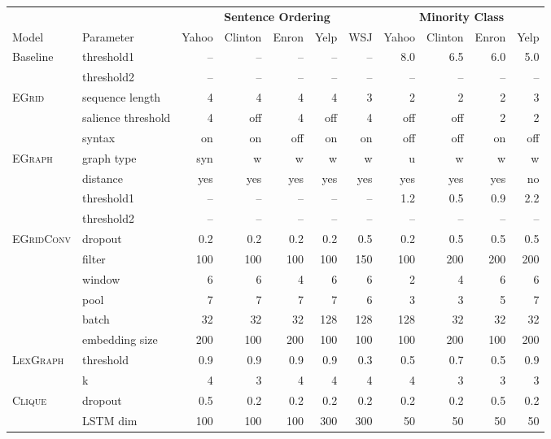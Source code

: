 \documentclass[11pt,a4paper]{article}
\newcommand \egrid{\textsc{EGrid}\xspace}
\newcommand \egraph{\textsc{EGraph}\xspace}
\newcommand \lexgraph{\textsc{LexGraph}\xspace}
\newcommand \clique{\textsc{Clique}\xspace}
\newcommand \egridconv{\textsc{EGridConv}\xspace}
\begin{document}
\begin{table*}[htb]
\begin{center}
\begin{footnotesize}
\begin{tabular}{llrrrrrrrrr}
\toprule
 & & \multicolumn{5}{c}{\textbf{Sentence Ordering}} & \multicolumn{4}{c}{\textbf{Minority Class}} \\
Model & Parameter & Yahoo & Clinton & Enron & Yelp & WSJ & Yahoo & Clinton & Enron & Yelp \\
\midrule
Baseline & threshold1  & -- & -- & -- & -- & -- & 8.0 & 6.5 & 6.0 & 5.0 \\
			& threshold2 & -- & -- & -- & -- & -- & -- & -- & -- & -- \\
\midrule
\egrid	& sequence length &  4 & 4 & 4 & 4 & 3 & 2 & 2 & 2 & 3 \\
		& salience threshold & 4 & off & 4 & off & 4 & off & off & 2 & 2 \\
        & syntax & on & on & off & on & on & off & off & on & off \\
        \midrule
\egraph 	& graph type &  syn & w & w & w & w & u & w & w & w \\
		& distance & yes & yes & yes & yes & yes & yes & yes & yes & no \\
        & threshold1 & -- & -- & -- & -- & -- & 1.2 & 0.5 & 0.9 & 2.2 \\
        & threshold2 & -- & -- & -- & -- & -- & -- & -- & -- & --\\
        \midrule
\egridconv 	& dropout & 0.2 & 0.2 & 0.2 & 0.2 & 0.5 & 0.2 & 0.5 & 0.5 & 0.5 \\
			& filter & 100 & 100 & 100 & 100 & 150 & 100 & 200 & 200 & 200 \\
            & window & 6 & 6 & 4 & 6 & 6 & 2 & 4 & 6 & 6 \\
            & pool & 7 & 7 & 7 & 7 & 6 & 3 & 3 & 5 & 7 \\
            & batch & 32 & 32 & 32 & 128 & 128 & 128 & 32 & 32 & 32 \\
            & embedding size & 200 & 100 & 200 & 100 & 100 & 100 & 200 & 100 & 200 \\
            \midrule
\lexgraph	& threshold & 0.9 & 0.9 & 0.9 & 0.9 & 0.3 & 0.5 & 0.7 & 0.5 & 0.9 \\
	& k &  4 & 3 & 4 & 4 & 4 & 4 & 3 & 3 & 3 \\
    \midrule
\clique	& dropout & 0.5 & 0.2 & 0.2 & 0.2 & 0.2 & 0.2 & 0.2 & 0.5 & 0.2 \\
		& LSTM dim & 100 & 100 & 100 & 300 & 300 & 50 & 50 & 50 & 50 \\

\end{tabular}
\end{footnotesize}
\end{center}
\end{table*}
\end{document}
